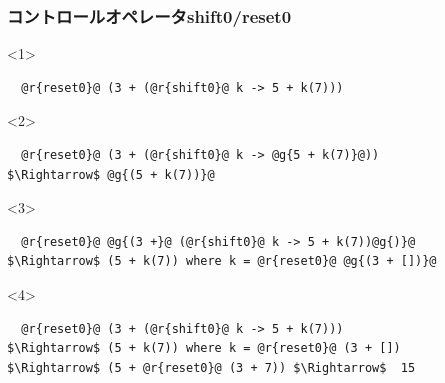 \documentclass[dvipdfmx,cjk,xcolor=dvipsnames,envcountsect,notheorems,12pt]{beamer}
\theoremstyle{definition}
\begin{document}
\begin{frame}[fragile]
  \frametitle{コントロールオペレータshift0/reset0}
  \begin{onlyenv}<1>
\begin{lstlisting}
  @r{reset0}@ (3 + (@r{shift0}@ k -> 5 + k(7)))

\end{lstlisting}
  \end{onlyenv}

  \begin{onlyenv}<2>
\begin{lstlisting}
  @r{reset0}@ (3 + (@r{shift0}@ k -> @g{5 + k(7)}@))
$\Rightarrow$ @g{(5 + k(7))}@

\end{lstlisting}
  \end{onlyenv}

  \begin{onlyenv}<3>
\begin{lstlisting}
  @r{reset0}@ @g{(3 +}@ (@r{shift0}@ k -> 5 + k(7))@g{)}@
$\Rightarrow$ (5 + k(7)) where k = @r{reset0}@ @g{(3 + [])}@

\end{lstlisting}
  \end{onlyenv}

  \begin{onlyenv}<4>
\begin{lstlisting}
  @r{reset0}@ (3 + (@r{shift0}@ k -> 5 + k(7)))
$\Rightarrow$ (5 + k(7)) where k = @r{reset0}@ (3 + [])
$\Rightarrow$ (5 + @r{reset0}@ (3 + 7)) $\Rightarrow$  15
\end{lstlisting}
  \end{onlyenv}


\end{frame}
\end{document}
